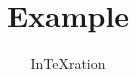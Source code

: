 \documentclass{article}
\title{Example}
\author{InTeXration}
\begin{document}
\maketitle

\lipsum
\end{document}
